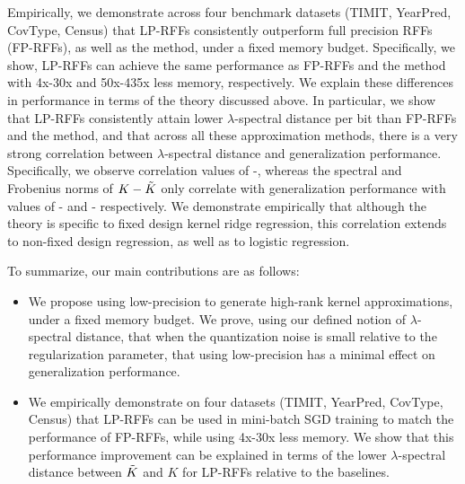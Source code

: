 
 

Empirically, we demonstrate across four benchmark datasets (TIMIT, YearPred, CovType, Census) that LP-RFFs consistently outperform full precision RFFs (FP-RFFs), as well as the \Nystrom method, under a fixed memory budget. Specifically, we show, LP-RFFs can achieve the same performance as FP-RFFs and the \Nystrom method with 4x-30x and 50x-435x less memory, respectively. We explain these differences in performance in terms of the theory discussed above. In particular, we show that LP-RFFs consistently attain lower $\lambda$-spectral distance per bit than FP-RFFs and the \Nystrom method, and that across all these approximation methods, there is a very strong correlation between $\lambda$-spectral distance and generalization performance.  Specifically, we observe correlation values of -, whereas the spectral and Frobenius norms of $K-\tilde{K}$ only correlate with generalization performance with values of - and - respectively.  We demonstrate empirically that although the theory is specific to fixed design kernel ridge regression, this correlation extends to non-fixed design regression, as well as to logistic regression.  

To summarize, our main contributions are as follows:
\begin{itemize}
	\item We propose using low-precision to generate high-rank kernel approximations, under a fixed memory budget. We prove, using our defined notion of $\lambda$-spectral distance, that when the quantization noise is small relative to the regularization parameter, that using low-precision has a minimal effect on generalization performance.
	\item We empirically demonstrate on four datasets (TIMIT, YearPred, CovType, Census) that LP-RFFs can be used in mini-batch SGD training to match the performance of FP-RFFs, while using 4x-30x less memory.  We show that this performance improvement can be explained in terms of the lower $\lambda$-spectral distance between $\tilde{K}$ and $K$ for LP-RFFs relative to the baselines.
\end{itemize}

